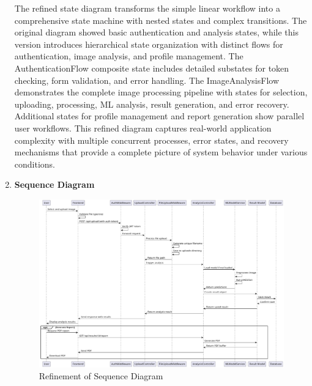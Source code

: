 \begin{enumerate}[label=\roman*.]
          The refined state diagram transforms the simple linear workflow into a comprehensive state machine with nested states and complex transitions. The original diagram showed basic authentication and analysis states, while this version introduces hierarchical state organization with distinct flows for authentication, image analysis, and profile management. The AuthenticationFlow composite state includes detailed substates for token checking, form validation, and error handling. The ImageAnalysisFlow demonstrates the complete image processing pipeline with states for selection, uploading, processing, ML analysis, result generation, and error recovery. Additional states for profile management and report generation show parallel user workflows. This refined diagram captures real-world application complexity with multiple concurrent processes, error states, and recovery mechanisms that provide a complete picture of system behavior under various conditions.
    \item \textbf{Sequence Diagram}
          \begin{center}
              \begin{figure}[H]
                  \centering
                  \includegraphics[width=1\linewidth]{Images/Refined/sequence.pdf}
                  \caption{Refinement of Sequence Diagram}
                  \label{fig:RefinementofSequenceDiagram}
              \end{figure}
          \end{center}

\end{enumerate}

